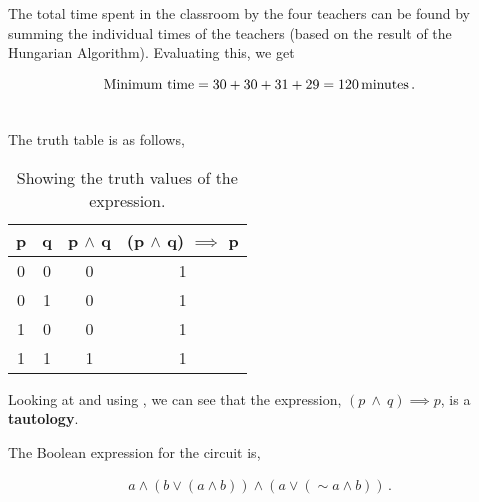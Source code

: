 \begin{subquestions}
\begin{subsubquestions}
\subsubquestion
		
		The total time spent in the classroom by the four teachers can be found by summing the individual times of the teachers (based on the result of the Hungarian Algorithm). Evaluating this, we get
		
		\begin{align}
			\text{Minimum time} = 30+30+31+29 = 120 \, \text{minutes}\,. \\ \nonumber 
		\end{align}	
	\end{subsubquestions}
	
	
\subquestion
	
The truth table is as follows,
	
\begin{table}[ht]
		\centering
		\begin{tabular}{|c|c|c|c|}
			\hline
			p & q & p $\land$ q & (p $\land$ q) $\implies$ p \\
			\hline
			0 & 0 & 0 & 1 \\
			0 & 1 & 0 & 1 \\
			1 & 0 & 0 & 1 \\
			1 & 1 & 1 & 1 \\
			\hline
		\end{tabular}
		\caption{\label{2015:q2:tab:TrthTab} Showing the truth values of the expression.}
\end{table}        
	
Looking at  and using , we can see that the expression, $(p \: \land \: q) \implies p$, is a \textbf{tautology}.  \\
	
		
\subquestion
	
\begin{subsubquestions}
		
\subsubquestion
		
The Boolean expression for the circuit is,
		
		\begin{align}
			a \land (b \lor (a \land b)) \land (a \lor (\sim a \land b))\,.
		\end{align}	
		

\end{subsubquestions}
\end{subquestions}
